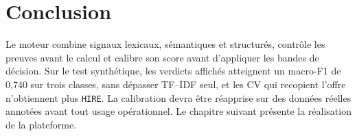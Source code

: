 \section*{Conclusion}

Le moteur combine signaux lexicaux, sémantiques et structurés, contrôle les preuves avant le calcul et calibre son score avant d'appliquer les bandes de décision. Sur le test synthétique, les verdicts affichés atteignent un macro-F1 de 0,740 sur trois classes, sans dépasser TF--IDF seul, et les CV qui recopient l'offre n'obtiennent plus \texttt{HIRE}. La calibration devra être réapprise sur des données réelles annotées avant tout usage opérationnel. Le chapitre suivant présente la réalisation de la plateforme.

